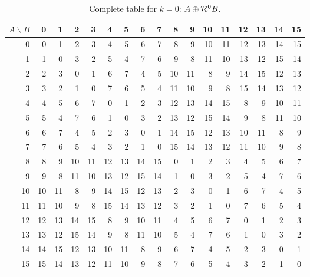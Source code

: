 \begin{table}[!htbp]\centering\small
\setlength{\tabcolsep}{5.0pt}\renewcommand{\arraystretch}{1.10}
\begin{tabular}{r|rrrrrrrrrrrrrrrr}\toprule
$A\backslash B$ & 0 & 1 & 2 & 3 & 4 & 5 & 6 & 7 & 8 & 9 & 10 & 11 & 12 & 13 & 14 & 15\\\midrule
0 & 0 & 1 & 2 & 3 & 4 & 5 & 6 & 7 & 8 & 9 & 10 & 11 & 12 & 13 & 14 & 15\\
1 & 1 & 0 & 3 & 2 & 5 & 4 & 7 & 6 & 9 & 8 & 11 & 10 & 13 & 12 & 15 & 14\\
2 & 2 & 3 & 0 & 1 & 6 & 7 & 4 & 5 & 10 & 11 & 8 & 9 & 14 & 15 & 12 & 13\\
3 & 3 & 2 & 1 & 0 & 7 & 6 & 5 & 4 & 11 & 10 & 9 & 8 & 15 & 14 & 13 & 12\\
4 & 4 & 5 & 6 & 7 & 0 & 1 & 2 & 3 & 12 & 13 & 14 & 15 & 8 & 9 & 10 & 11\\
5 & 5 & 4 & 7 & 6 & 1 & 0 & 3 & 2 & 13 & 12 & 15 & 14 & 9 & 8 & 11 & 10\\
6 & 6 & 7 & 4 & 5 & 2 & 3 & 0 & 1 & 14 & 15 & 12 & 13 & 10 & 11 & 8 & 9\\
7 & 7 & 6 & 5 & 4 & 3 & 2 & 1 & 0 & 15 & 14 & 13 & 12 & 11 & 10 & 9 & 8\\
8 & 8 & 9 & 10 & 11 & 12 & 13 & 14 & 15 & 0 & 1 & 2 & 3 & 4 & 5 & 6 & 7\\
9 & 9 & 8 & 11 & 10 & 13 & 12 & 15 & 14 & 1 & 0 & 3 & 2 & 5 & 4 & 7 & 6\\
10 & 10 & 11 & 8 & 9 & 14 & 15 & 12 & 13 & 2 & 3 & 0 & 1 & 6 & 7 & 4 & 5\\
11 & 11 & 10 & 9 & 8 & 15 & 14 & 13 & 12 & 3 & 2 & 1 & 0 & 7 & 6 & 5 & 4\\
12 & 12 & 13 & 14 & 15 & 8 & 9 & 10 & 11 & 4 & 5 & 6 & 7 & 0 & 1 & 2 & 3\\
13 & 13 & 12 & 15 & 14 & 9 & 8 & 11 & 10 & 5 & 4 & 7 & 6 & 1 & 0 & 3 & 2\\
14 & 14 & 15 & 12 & 13 & 10 & 11 & 8 & 9 & 6 & 7 & 4 & 5 & 2 & 3 & 0 & 1\\
15 & 15 & 14 & 13 & 12 & 11 & 10 & 9 & 8 & 7 & 6 & 5 & 4 & 3 & 2 & 1 & 0\\
\bottomrule\end{tabular}
\caption{Complete table for $k=0$: $A\oplus\mathcal R^0B$.}
\end{table}
